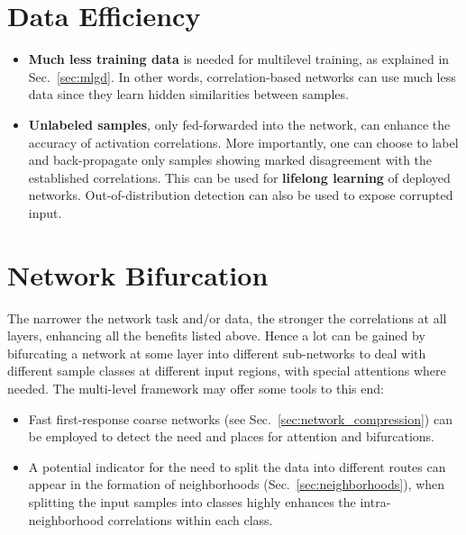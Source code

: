 \documentclass{article} %
\begin{document}

\section{Data Efficiency}
\label{sec:effective_data}
\begin{itemize}
	\item \textbf{Much less training data} is needed for multilevel training, as explained in Sec.~\ref{sec:mlgd}. In other words, correlation-based networks can use much less data since they learn hidden similarities between samples.
	\item \textbf{Unlabeled samples}, only fed-forwarded into the network, can enhance the accuracy of activation correlations. More importantly, one can choose to label and back-propagate only samples showing marked disagreement with the established correlations. This can be used for \textbf{lifelong learning} of deployed networks. Out-of-distribution detection can also be used to expose corrupted input.
\end{itemize}


\section{Network Bifurcation}
\label{sec:bifurcation}
The narrower the network task and/or data, the stronger the correlations at all layers, enhancing all the benefits listed above. Hence a lot can be gained by bifurcating a network at some layer into different sub-networks to deal with different sample classes at different input regions, with special attentions where needed. The multi-level framework may offer some tools to this end:
\begin{itemize}
	\item Fast first-response coarse networks (see Sec.~\ref{sec:network_compression}) can be employed to detect the need and places for attention and bifurcations.
	\item A potential indicator for the need to split the data into different routes can appear in the formation of neighborhoods (Sec.~\ref{sec:neighborhoods}), when splitting the input samples into classes highly enhances the intra-neighborhood correlations within each class.
\end{itemize}
\end{document}

